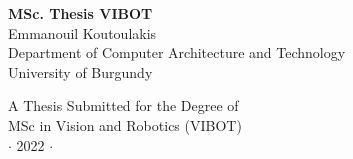 
\newpage
\thispagestyle{empty}


\vspace*{2cm}
\begin{center}
{\Large\bf MSc. Thesis VIBOT\\} \vspace{2cm} {\large
Emmanouil Koutoulakis\\
\vspace{2cm}
Department of Computer Architecture and Technology \\
University of Burgundy}

\end{center}

\vspace{7cm}
\begin{center}
{\large A Thesis Submitted for the Degree of \\MSc in Vision and Robotics (VIBOT) \\\vspace{0.3cm} $\cdot$ 2022
$\cdot$}
\end{center}
\singlespacing


